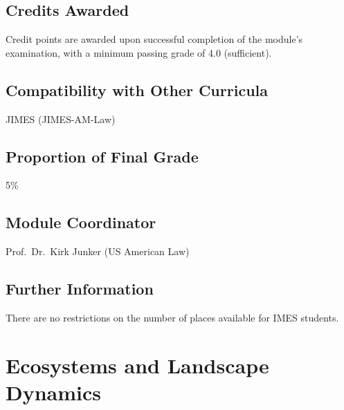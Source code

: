 \documentclass[
  letterpaper,
  10pt,
  openany]{book}
\begin{document}
\section*{Credits Awarded}\label{credits-awarded-2}


Credit points are awarded upon successful completion of the module's
examination, with a minimum passing grade of 4.0 (sufficient).

\section*{Compatibility with Other
Curricula}\label{compatibility-with-other-curricula-2}


JIMES (JIMES-AM-Law)

\section*{Proportion of Final Grade}\label{proportion-of-final-grade-2}


5\%

\section*{Module Coordinator}\label{module-coordinator-2}


Prof.~Dr.~Kirk Junker (US American Law)

\section*{Further Information}\label{further-information-2}


There are no restrictions on the number of places available for IMES
students.

\chapter*{Ecosystems and Landscape
Dynamics}\label{ecosystems-and-landscape-dynamics}
\end{document}
